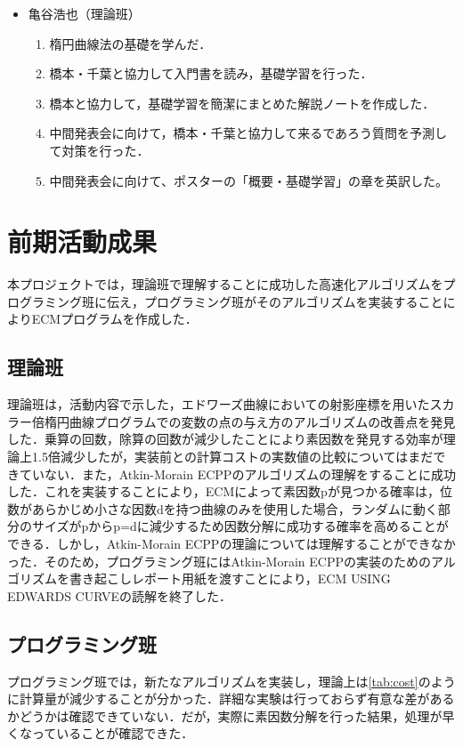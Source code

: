 \documentclass[openany,11pt,papersize]{jsbook}
\begin{document}
\begin{itemize}
\item 亀谷浩也（理論班）
 \begin{enumerate}
 \renewcommand{\labelenumi}{(\arabic{enumi})}
 \item 楕円曲線法の基礎を学んだ．
 \item 橋本・千葉と協力して入門書を読み，基礎学習を行った．
 \item 橋本と協力して，基礎学習を簡潔にまとめた解説ノートを作成した．
 \item 中間発表会に向けて，橋本・千葉と協力して来るであろう質問を予測して対策を行った．
 \item 中間発表会に向けて、ポスターの「概要・基礎学習」の章を英訳した。
 \end{enumerate}
 
\end{itemize}


\chapter{前期活動成果}


本プロジェクトでは，理論班で理解することに成功した高速化アルゴリズムをプログラミング班に伝え，プログラミング班がそのアルゴリズムを実装することによりECMプログラムを作成した．


\section{理論班}

理論班は，活動内容で示した，エドワーズ曲線においての射影座標を用いたスカラー倍楕円曲線プログラムでの変数の点の与え方のアルゴリズムの改善点を発見した．乗算の回数，除算の回数が減少したことにより素因数を発見する効率が理論上1.5倍減少したが，実装前との計算コストの実数値の比較についてはまだできていない．また，Atkin-Morain ECPPのアルゴリズムの理解をすることに成功した．これを実装することにより，ECMによって素因数pが見つかる確率は，位数があらかじめ小さな因数dを持つ曲線のみを使用した場合，ランダムに動く部分のサイズがpからp=dに減少するため因数分解に成功する確率を高めることができる．しかし，Atkin-Morain ECPPの理論については理解することができなかった．そのため，プログラミング班にはAtkin-Morain ECPPの実装のためのアルゴリズムを書き起こしレポート用紙を渡すことにより，ECM USING EDWARDS CURVEの読解を終了した．


\section{プログラミング班}
プログラミング班では，新たなアルゴリズムを実装し，理論上は\ref{tab:cost}のように計算量が減少することが分かった．詳細な実験は行っておらず有意な差があるかどうかは確認できていない．だが，実際に素因数分解を行った結果，処理が早くなっていることが確認できた．
\end{document}
